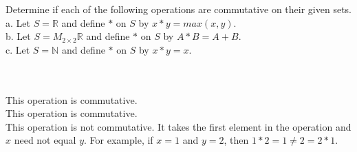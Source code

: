 Determine if each of the following operations are commutative on their given sets.\\

a. Let $S=\mathbb{R}$ and define $*$ on $S$ by $x*y=max(x,y)$.\\

b. Let $S=M_{2\times2}\mathbb{R}$ and define $*$ on $S$ by $A*B=A+B$.\\

c. Let $S=\mathbb{N}$ and define $*$ on $S$ by $x*y=x$.\\\\

\begin{solution}\renewcommand{\qedsymbol}{}\ \\
    This operation is commutative.\\

    This operation is commutative.\\

    This operation is not commutative. It takes the first element in the operation and $x$ need not
    equal $y$. For example, if $x=1$ and $y=2$, then $1*2=1\neq 2=2*1$.\\

\end{solution}